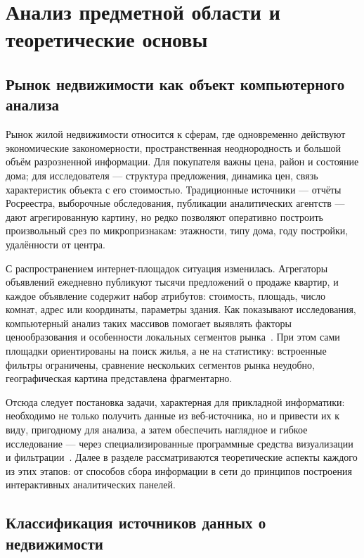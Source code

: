 \section{Анализ предметной области и теоретические основы}

\subsection{Рынок недвижимости как объект компьютерного анализа}

Рынок жилой недвижимости относится к сферам, где одновременно действуют экономические закономерности, пространственная неоднородность и большой объём разрозненной информации. Для покупателя важны цена, район и состояние дома; для исследователя --- структура предложения, динамика цен, связь характеристик объекта с его стоимостью. Традиционные источники --- отчёты Росреестра, выборочные обследования, публикации аналитических агентств --- дают агрегированную картину, но редко позволяют оперативно построить произвольный срез по микропризнакам: этажности, типу дома, году постройки, удалённости от центра.

С распространением интернет-площадок ситуация изменилась. Агрегаторы объявлений ежедневно публикуют тысячи предложений о продаже квартир, и каждое объявление содержит набор атрибутов: стоимость, площадь, число комнат, адрес или координаты, параметры здания. Как показывают исследования, компьютерный анализ таких массивов помогает выявлять факторы ценообразования и особенности локальных сегментов рынка~\cite{soboleva2023,belyaev2015}. При этом сами площадки ориентированы на поиск жилья, а не на статистику: встроенные фильтры ограничены, сравнение нескольких сегментов рынка неудобно, географическая картина представлена фрагментарно.

Отсюда следует постановка задачи, характерная для прикладной информатики: необходимо не только получить данные из веб-источника, но и привести их к виду, пригодному для анализа, а затем обеспечить наглядное и гибкое исследование --- через специализированные программные средства визуализации и фильтрации~\cite{filatov2013,ahtimirov2024}. Далее в разделе рассматриваются теоретические аспекты каждого из этих этапов: от способов сбора информации в сети до принципов построения интерактивных аналитических панелей.

\subsection{Классификация источников данных о недвижимости}

